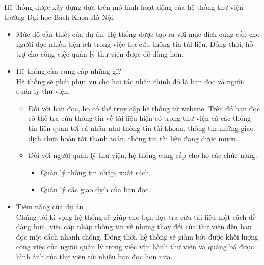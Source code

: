 \documentclass[../report.tex]{subfiles}
\begin{document}
Hệ thống được xây dựng dựa trên mô hình hoạt động của hệ thống thư viện trường Đại học Bách Khoa Hà Nội.	 
\begin{itemize}
    \item Mức độ cần thiết của dự án: Hệ thống được tạo ra với mục đích cung cấp cho người đọc nhiều tiện ích trong 
        việc tra cứu thông tin tài liệu. Đồng thời, hỗ trợ cho công việc quản lý thư viện được dễ dàng hơn.	 
    \item Hệ thống cần cung cấp những gì?	 \\
        Hệ thống sẽ phải phục vụ cho hai tác nhân chính đó là bạn đọc và người quản lý thư viện.
        \begin{itemize}
            \item Đối với bạn đọc, họ có thể truy cập hệ thống từ website. 
            Trên đó bạn đọc có thể tra cứu thông tin về tài liệu hiện có trong thư 
            viện và các thông tin liên quan tới cá nhân như thông tin tài khoản, 
            thông tin những giao dịch chưa hoàn tất thanh toán, thông tin tài liệu đang dược mượn.
            \item Đối với người quản lý thư viện, hệ thống cung cấp cho họ các chức năng:
                \begin{itemize}
                    \item Quản lý thông tin nhập, xuất sách.
                    \item Quản lý các giao dịch của bạn đọc.
                \end{itemize}
        \end{itemize}
    \item Tiềm năng của dự án \\
        Chúng tôi kì vọng hệ thống sẽ giúp cho bạn đọc tra cứu tài liệu một cách dễ dàng hơn, 
        việc cập nhập thông tin về những thay đổi của thư viện đến bạn đọc một cách nhanh chóng. 
        Đồng thời, hệ thống sẽ giảm bớt được khối lượng công việc của người quản lý trong việc 
        vận hành thư viện và quảng bá được hình ảnh của thư viện tới nhiều bạn đọc hơn nữa.
\end{itemize}
\end{document}

